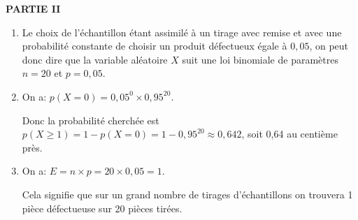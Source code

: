 \textbf{PARTIE II}

\medskip







\begin{enumerate}
\item 
Le choix de l'échantillon étant assimilé à un tirage avec remise et avec une probabilité constante de choisir un produit défectueux égale à $ 0,05$, on peut donc dire que la variable aléatoire $X$ suit une loi binomiale de paramètres $n = 20$ et $p  = 0,05$.
\item 


On a: $p(X = 0) = 0,05^0 \times 0,95^{20}$.

Donc la probabilité cherchée est $p(X \geqslant 1) = 1 -p(X =0) = 1 - 0,95^{20} \approx 0,642$, soit 0,64 au centième près.
\item 
On a: $E = n \times p = 20 \times 0,05 = 1$.

Cela signifie que sur un grand nombre de tirages d'échantillons on trouvera 1 pièce défectueuse sur 20 pièces tirées.
\end{enumerate}

\vspace{0,5cm}
